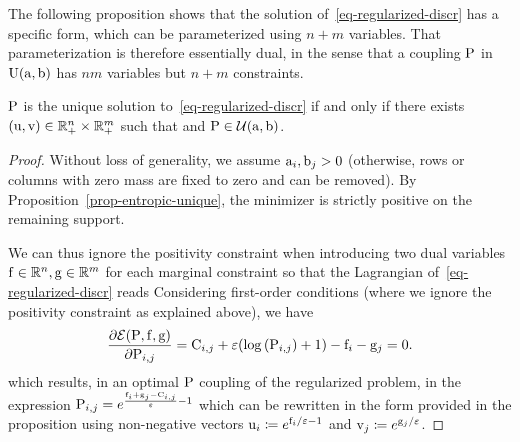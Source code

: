 The following proposition shows that the solution of~\eqref{eq-regularized-discr} has a specific form, which can be parameterized using $n+m$ variables. That parameterization is therefore essentially dual, in the sense that a coupling $\P$ in $\CouplingsD(\a,\b)$ has $nm$ variables but $n+m$ constraints.

\begin{prop}\label{prop-regularized-primal}
$\P$ is the unique solution to~\eqref{eq-regularized-discr} if and only if there exists $(\uD,\vD) \in \RR_+^n \times \RR_+^m$ such that
and $\P \in \Couplings(\a,\b)$.
\end{prop}

\begin{proof}
	Without loss of generality, we assume $\a_i,\b_j>0$ (otherwise, rows or columns with zero mass are fixed to zero and can be removed). By Proposition~\ref{prop-entropic-unique}, the minimizer is strictly positive on the remaining support.

	We can thus ignore the positivity constraint when introducing two dual variables $\fD\in\RR^n,\gD\in\RR^m$ for each marginal constraint so that the Lagrangian of~\eqref{eq-regularized-discr} reads
Considering first-order conditions (where we ignore the positivity constraint as explained above), we have
$$
	\frac{\partial\Lag(\P,\fD,\gD)}{\partial \P_{i,j}}= \C_{i,j} + \epsilon (\log\pa{ \P_{i,j} }+1) - \fD_i -\gD_j = 0.
$$
which results, in an optimal $\P$ coupling of the regularized problem, in the expression
$\P_{i,j}=e^{\frac{\fD_i+\gD_j - \C_{i,j}}{\epsilon}-1}$
which can be rewritten in the form provided in the proposition using non-negative vectors $\uD_i \eqdef e^{\fD_i/\epsilon-1}$ and $\vD_j \eqdef e^{\gD_j/\epsilon}$.
\end{proof}


